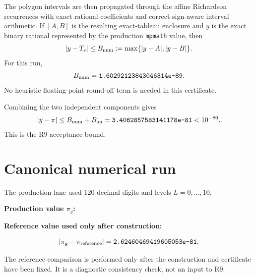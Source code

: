 \documentclass[11pt]{article}
\newcommand{\pig}{\pi_g}
\begin{document}
The polygon intervals are then propagated through the affine Richardson recurrences with exact rational coefficients and correct sign-aware interval arithmetic.  If $[A,B]$ is the resulting exact-tableau enclosure and $y$ is the exact binary rational represented by the production \texttt{mpmath} value, then
\[
 |y-T_s|\le B_{\rm num}
 :=\max\{|y-A|,|y-B|\}.
\]
For this run,
\[
 B_{\rm num}=\texttt{1.60292123843046314e-89}.
\]
No heuristic floating-point round-off term is needed in this certificate.

Combining the two independent components gives
\[
 |y-\pi|\le B_{\rm num}+B_{\rm an}
 =\texttt{3.4062857583141178e-81}<10^{-80}.
\]
This is the R9 acceptance bound.

\section{Canonical numerical run}

The production lane used 120 decimal digits and levels $L=0,\ldots,10$.

\textbf{Production value $\pig$:}

{\small\ttfamily{}}

\textbf{Reference value used only after construction:}

{\small\ttfamily{}}

\[
|\pig-\pi_{\rm reference}|=\texttt{2.62460469419605053e-81}.
\]

The reference comparison is performed only after the construction and certificate have been fixed.  It is a diagnostic consistency check, not an input to R9.
\end{document}
